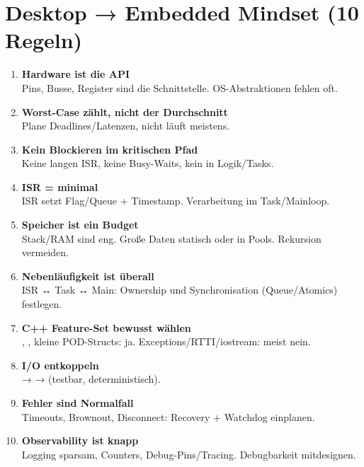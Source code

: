 
\section{Desktop → Embedded Mindset (10 Regeln)}
\label{sec:embedded-mindset}

\begin{enumerate}
  \item \textbf{Hardware ist die API}\\
    Pins, Busse, Register sind \glqq die Schnittstelle\grqq. OS-Abstraktionen fehlen oft.

  \item \textbf{Worst-Case zählt, nicht der Durchschnitt}\\
    Plane Deadlines/Latenzen, nicht \glqq läuft meistens\grqq.

  \item \textbf{Kein Blockieren im kritischen Pfad}\\
    Keine langen ISR, keine Busy-Waits, kein  in Logik/Tasks.

  \item \textbf{ISR = minimal}\\
    ISR setzt Flag/Queue + Timestamp. Verarbeitung im Task/Mainloop.

  \item \textbf{Speicher ist ein Budget}\\
    Stack/RAM sind eng. Große Daten statisch oder in Pools. Rekursion vermeiden.

  \item \textbf{Nebenläufigkeit ist überall}\\
    ISR ↔ Task ↔ Main: Ownership und Synchronisation (Queue/Atomics) festlegen.

  \item \textbf{C++ Feature-Set bewusst wählen}\\
    , , kleine POD-Structs: ja. Exceptions/RTTI/iostream: meist nein.

  \item \textbf{I/O entkoppeln}\\
     →  →  (testbar, deterministisch).

  \item \textbf{Fehler sind Normalfall}\\
    Timeouts, Brownout, Disconnect: Recovery + Watchdog einplanen.

  \item \textbf{Observability ist knapp}\\
    Logging sparsam, Counters, Debug-Pins/Tracing. Debugbarkeit mitdesignen.
\end{enumerate}

